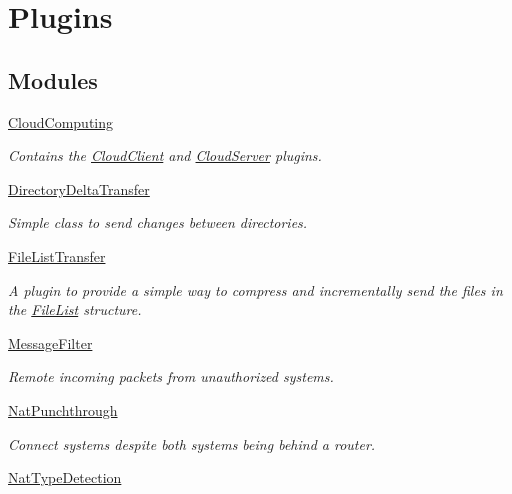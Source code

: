 \hypertarget{group___p_l_u_g_i_n_s___g_r_o_u_p}{\section{Plugins}
\label{group___p_l_u_g_i_n_s___g_r_o_u_p}
}
\subsection*{Modules}
\begin{DoxyCompactItemize}
\item 
\hyperlink{group___c_l_o_u_d___g_r_o_u_p}{Cloud\-Computing}
\begin{DoxyCompactList}\small\item\em Contains the \hyperlink{class_rak_net_1_1_cloud_client}{Cloud\-Client} and \hyperlink{class_rak_net_1_1_cloud_server}{Cloud\-Server} plugins. \end{DoxyCompactList}\item 
\hyperlink{group___d_i_r_e_c_t_o_r_y___d_e_l_t_a___t_r_a_n_s_f_e_r___g_r_o_u_p}{Directory\-Delta\-Transfer}
\begin{DoxyCompactList}\small\item\em Simple class to send changes between directories. \end{DoxyCompactList}\item 
\hyperlink{group___f_i_l_e___l_i_s_t___t_r_a_n_s_f_e_r___g_r_o_u_p}{File\-List\-Transfer}
\begin{DoxyCompactList}\small\item\em A plugin to provide a simple way to compress and incrementally send the files in the \hyperlink{class_rak_net_1_1_file_list}{File\-List} structure. \end{DoxyCompactList}\item 
\hyperlink{group___m_e_s_s_a_g_e_f_i_l_t_e_r___g_r_o_u_p}{Message\-Filter}
\begin{DoxyCompactList}\small\item\em Remote incoming packets from unauthorized systems. \end{DoxyCompactList}\item 
\hyperlink{group___n_a_t___p_u_n_c_h_t_h_r_o_u_g_h___g_r_o_u_p}{Nat\-Punchthrough}
\begin{DoxyCompactList}\small\item\em Connect systems despite both systems being behind a router. \end{DoxyCompactList}\item 
\hyperlink{group___n_a_t___t_y_p_e___d_e_t_e_c_t_i_o_n___g_r_o_u_p}{Nat\-Type\-Detection}

\end{DoxyCompactItemize}
